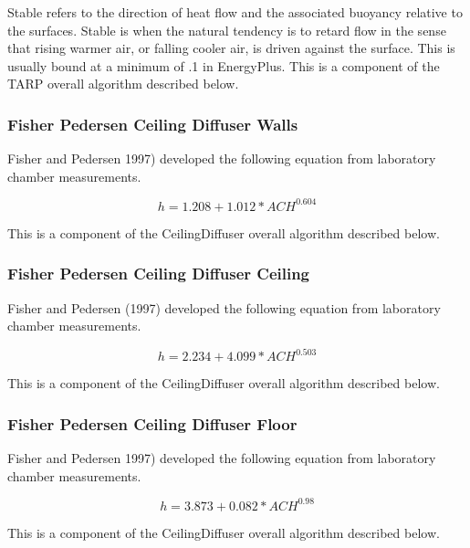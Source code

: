 Stable refers to the direction of heat flow and the associated buoyancy relative to the surfaces. Stable is when the natural tendency is to retard flow in the sense that rising warmer air, or falling cooler air, is driven against the surface. This is usually bound at a minimum of .1 in EnergyPlus. This is a component of the TARP overall algorithm described below.

\subsubsection{Fisher Pedersen Ceiling Diffuser Walls}\label{fisher-pedersen-ceiling-diffuser-walls}

Fisher and Pedersen 1997) developed the following equation from laboratory chamber measurements.

\begin{equation}
h = 1.208 + 1.012 * AC{H^{0.604}}
\end{equation}

This is a component of the CeilingDiffuser overall algorithm described below.

\subsubsection{Fisher Pedersen Ceiling Diffuser Ceiling}\label{fisher-pedersen-ceiling-diffuser-ceiling}

Fisher and Pedersen (1997) developed the following equation from laboratory chamber measurements.

\begin{equation}
h = 2.234 + 4.099 * AC{H^{0.503}}
\end{equation}

This is a component of the CeilingDiffuser overall algorithm described below.

\subsubsection{Fisher Pedersen Ceiling Diffuser Floor}\label{fisher-pedersen-ceiling-diffuser-floor}

Fisher and Pedersen 1997) developed the following equation from laboratory chamber measurements.

\begin{equation}
h = 3.873 + 0.082 * AC{H^{0.98}}
\end{equation}

This is a component of the CeilingDiffuser overall algorithm described below.

